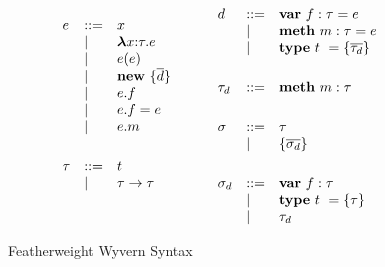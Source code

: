 \begin{figure}
\centering
\[
\begin{array}{lll}

e    & ::= & x \\
     & \mathrel{\mid} & \boldsymbol\lambda x{:}\tau . e \\
     & \mathrel{\mid} & e(e) \\
     & \mathrel{\mid} & \textbf{new}~ \{ \overline{d} \}\\
     & \mathrel{\mid} & e.f \\
     & \mathrel{\mid} & e.f = e \\
     & \mathrel{\mid} & e.m \\
\\[1ex]

\tau & ::= & t\\
     & \mathrel{\mid} & \tau \rightarrow \tau \\
\\[1ex]
	 
\end{array}
\begin{array}{lll}
~~~~
\end{array}
\begin{array}{lll}
	 
d   & ::= & \textbf{var}~ f:\tau = e \\
     & \mathrel{\mid} & \textbf{meth}~ m:\tau = e \\
     & \mathrel{\mid} & \textbf{type}~ t~ = \{ \overline{\tau_d} \} \\
\\[1ex]

\tau_d   & ::= & \textbf{meth}~ m:\tau \\
\\[1ex]

\sigma & ::= & \tau \\
       & \mathrel{\mid} & \{ \overline{\sigma_d} \} \\
\\[1ex]

\sigma_d & ::= & \textbf{var}~ f:\tau \\
         & \mathrel{\mid} & \textbf{type}~ t~ = \{ \tau \}  \\
         & \mathrel{\mid} & \tau_d \\

\end{array}
\]
\caption{Featherweight Wyvern Syntax}
\label{fig:core2-syntax}
\end{figure}
